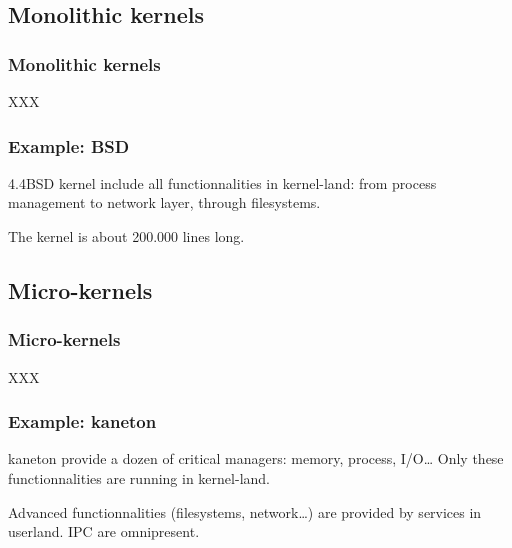 %
%

\subsection{Monolithic kernels}

%
%

\begin{frame}
  \frametitle{Monolithic kernels}

  XXX

\end{frame}

%
%

\begin{frame}
  \frametitle{Example: BSD}

  4.4BSD kernel include all functionnalities in kernel-land: from
    process management to network layer, through filesystems.

  \begin{center}
  \end{center}

  The kernel is about 200.000 lines long.

\end{frame}

%
%

\subsection{Micro-kernels}

%
%

\begin{frame}
  \frametitle{Micro-kernels}

  XXX

\end{frame}

%
%

\begin{frame}
  \frametitle{Example: kaneton}

  kaneton provide a dozen of critical managers: memory, process,
  I/O\ldots{} Only these functionnalities are running in kernel-land.

  \begin{center}
  \end{center}

  Advanced functionnalities (filesystems, network\ldots) are provided
  by services in userland. IPC are omnipresent.

\end{frame}

